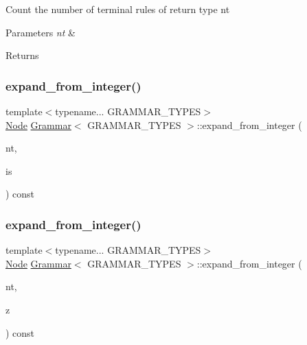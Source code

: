 Count the number of terminal rules of return type nt 
\begin{DoxyParams}{Parameters}
{\em nt} & \\
\hline
\end{DoxyParams}
\begin{DoxyReturn}{Returns}

\end{DoxyReturn}
\mbox{\label{class_grammar_ab20256e7e9e4c6077043465b3d440be9}} 
\subsubsection{\texorpdfstring{expand\+\_\+from\+\_\+integer()}{expand\_from\_integer()}\hspace{0.1cm}{\footnotesize\ttfamily [1/2]}}
{\footnotesize\ttfamily template$<$typename... G\+R\+A\+M\+M\+A\+R\+\_\+\+T\+Y\+P\+ES$>$ \\
\hyperlink{class_node}{Node} \hyperlink{class_grammar}{Grammar}$<$ G\+R\+A\+M\+M\+A\+R\+\_\+\+T\+Y\+P\+ES $>$\+::expand\+\_\+from\+\_\+integer (\begin{DoxyParamCaption}\item[{\hyperlink{_nonterminal_8h_a5c1f658dc7560600a16d22408bd716ca}{nonterminal\+\_\+t}}]{nt,  }\item[{\hyperlink{class_integerized_stack}{Integerized\+Stack} \&}]{is }\end{DoxyParamCaption}) const\hspace{0.3cm}{\ttfamily [inline]}}

\mbox{\label{class_grammar_a795d45fbbafb5c5dc17e5898a2016ce2}} 
\subsubsection{\texorpdfstring{expand\+\_\+from\+\_\+integer()}{expand\_from\_integer()}\hspace{0.1cm}{\footnotesize\ttfamily [2/2]}}
{\footnotesize\ttfamily template$<$typename... G\+R\+A\+M\+M\+A\+R\+\_\+\+T\+Y\+P\+ES$>$ \\
\hyperlink{class_node}{Node} \hyperlink{class_grammar}{Grammar}$<$ G\+R\+A\+M\+M\+A\+R\+\_\+\+T\+Y\+P\+ES $>$\+::expand\+\_\+from\+\_\+integer (\begin{DoxyParamCaption}\item[{\hyperlink{_nonterminal_8h_a5c1f658dc7560600a16d22408bd716ca}{nonterminal\+\_\+t}}]{nt,  }\item[{\hyperlink{_numerics_8h_a9fe2bbca873b046b2bd276fc6856bb88}{enumerationidx\+\_\+t}}]{z }\end{DoxyParamCaption}) const\hspace{0.3cm}{\ttfamily [inline]}}

